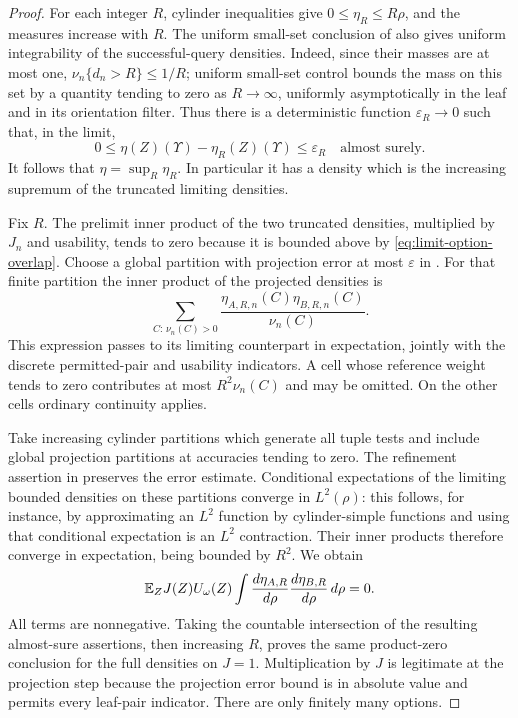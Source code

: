 \begin{proof}
For each integer $R$, cylinder inequalities give
$0\le\eta_R\le R\rho$, and the measures increase with $R$.
The uniform small-set conclusion of 
also gives uniform integrability of the successful-query densities.
Indeed, since their masses are at most one,
$\nu_n\{d_n>R\}\le1/R$; uniform small-set control bounds the mass on
this set by a quantity tending to zero as $R\to\infty$, uniformly
asymptotically in the leaf and in its orientation filter. Thus there is
a deterministic function $\varepsilon_R\to0$ such that, in the limit,
\[
0\le\eta(Z)(\Upsilon)-\eta_R(Z)(\Upsilon)\le\varepsilon_R
\quad\text{almost surely}.
\]
It follows that $\eta=\sup_R\eta_R$. In particular it has a density
which is the increasing supremum of the truncated limiting densities.

Fix $R$. The prelimit inner product of the two truncated densities,
multiplied by $J_n$ and usability, tends to zero because it is bounded above by
\eqref{eq:limit-option-overlap}. Choose a global partition with projection
error at most $\varepsilon$ in
. For that finite partition the inner
product of the projected densities is
\[
\sum_{C:\,\nu_n(C)>0}
 \frac{\eta_{A,R,n}(C)\eta_{B,R,n}(C)}{\nu_n(C)}.
\]
This expression passes to its limiting counterpart in expectation,
jointly with the discrete permitted-pair and usability indicators. A cell whose reference
weight tends to zero contributes at most $R^2\nu_n(C)$ and may be
omitted. On the other cells ordinary continuity applies.

Take increasing cylinder partitions which generate all tuple tests and
include global projection partitions at accuracies tending to zero.
The refinement assertion in  preserves
the error estimate. Conditional expectations of the limiting bounded
densities on these partitions converge in $L^2(\rho)$: this follows,
for instance, by approximating an $L^2$ function by cylinder-simple
functions and using that conditional expectation is an $L^2$
contraction. Their inner products therefore converge in expectation,
being bounded by $R^2$. We obtain
\[
\mathbb E_Z J(Z)U_\omega(Z)
 \int \frac{d\eta_{A,R}}{d\rho}
          \frac{d\eta_{B,R}}{d\rho}\,d\rho=0.
\]
All terms are nonnegative. Taking the countable intersection of the
resulting almost-sure assertions, then increasing $R$, proves the same
product-zero conclusion for the full densities on $J=1$. Multiplication
by $J$ is legitimate at the projection step because the projection
error bound is in absolute value and permits every leaf-pair indicator.
There are only finitely many options.
\end{proof}

